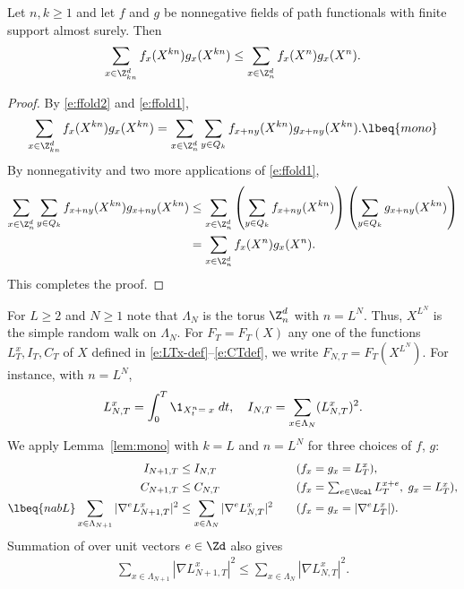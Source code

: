 \begin{lemma}
\label{lem:mono}
Let $n,k \ge 1$ and let $f$ and $g$ be nonnegative fields of path functionals
with finite support almost surely.
Then
\begin{equation}
\sum_{x\in\Z^d_{kn}} f_x(X^{kn}) g_x(X^{kn})
  \leq
\sum_{x\in\Z^d_n} f_x(X^n) g_x(X^n).
\end{equation}
\end{lemma}

\begin{proof}
By \eqref{e:ffold2} and \eqref{e:ffold1},
\begin{equation}
\sum_{x\in\Z_{kn}^d} f_x(X^{kn}) g_x(X^{kn})
  =
\sum_{x\in\Z_n^d}
\sum_{y \in Q_k}
  f_{x+ny}(X^{kn}) g_{x+ny}(X^{kn}).
\lbeq{mono}
\end{equation}
By nonnegativity and two more applications of \eqref{e:ffold1},
\begin{align}
\sum_{x\in\Z_n^d}
\sum_{y \in Q_k}
f_{x+ny}(X^{kn}) g_{x+ny}(X^{kn})
  &\le \sum_{x\in\Z_n^d}
      \left(\sum_{y \in Q_k} f_{x+ny}(X^{kn})\right)
      \left(\sum_{y \in Q_k} g_{x+ny}(X^{kn})\right) \nonumber \\
  &= \sum_{x\in\Z_n^d} f_x(X^n) g_x(X^n).
\end{align}
This completes the proof.
\end{proof}

For $L \geq 2$ and $N \geq 1$
note that $\Lambda_N$ is the torus $\Z^d_n$ with $n=L^N$.
Thus, $X^{L^N}$ is the simple random walk on $\Lambda_N$.
For $F_T = F_T(X)$ any one of the functions $L_T^x,I_T,C_T$
of $X$ defined in \eqref{e:LTx-def}--\eqref{e:CTdef},
we write $F_{N,T} = F_T(X^{L^N})$. For instance, with $n=L^N$,
\begin{equation}
    L^x_{N,T} = \int_0^T \1_{X^{n}_t=\;x} \; dt,
    \quad I_{N,T} = \sum_{x \in \Lambda_N}(L_{N,T}^x)^2 .
\end{equation}
We apply Lemma~\ref{lem:mono} with $k = L$ and $n = L^N$ for three
choices of $f$, $g$:
\begin{alignat}{2}
\label{e:ILT-mon}
I_{N+1,T} &\leq I_{N,T}
	\quad
&&(f_x=g_x=L_T^x),
	\\
\label{e:CSA-mon}
C_{N+1,T} &\leq C_{N,T}
	\quad
&&(f_x=\textstyle{\sum_{e\in \Ucal}L_T^{x+e}},\; g_x=L_T^x),
	\\
\lbeq{nabL}
\sum_{x\in\Lambda_{N+1}} |\nabla^e L^x_{N+1,T}|^2
	&\leq
\sum_{x\in\Lambda_N} |\nabla^e L^x_{N,T}|^2
	\quad
&& (f_x = g_x = \left|\nabla^e L_T^x\right|).
\end{alignat}
Summation of  over unit vectors $e\in\Zd$ also gives
\begin{align}
\label{e:gradLT-mon}
\sum_{x\in\Lambda_{N+1}} |\nabla L^x_{N+1,T}|^2
  \leq
\sum_{x\in\Lambda_N} |\nabla L^x_{N,T}|^2.
\end{align}

